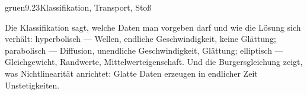 \begin{loesungkarte}{gruen}{9.23}{Klassifikation, Transport, Stoß}
\begin{mitnehmen}\kastentext
Die Klassifikation sagt, welche Daten man vorgeben darf und wie die Lösung sich verhält: hyperbolisch --- Wellen, endliche Geschwindigkeit, keine Glättung; parabolisch --- Diffusion, unendliche Geschwindigkeit, Glättung; elliptisch --- Gleichgewicht, Randwerte, Mittelwerteigenschaft. Und die Burgersgleichung zeigt, was Nichtlinearität anrichtet: Glatte Daten erzeugen in endlicher Zeit Unstetigkeiten.
\end{mitnehmen}
\end{loesungkarte}

